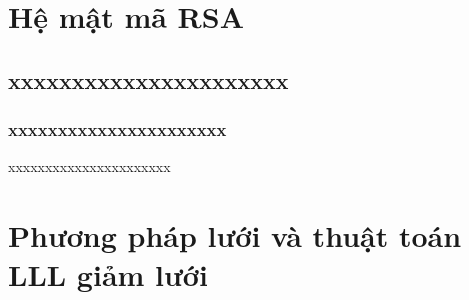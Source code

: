 \documentclass{beamer}
\begin{document}












 








\section{Hệ mật mã RSA}
\subsection{xxxxxxxxxxxxxxxxxxxxxx}
\subsubsection{xxxxxxxxxxxxxxxxxxxxxx}
\begin{frame}{xxxxxxxxxxxxxxxxxxxxxx}

\end{frame}





\section{Phương pháp lưới và thuật toán LLL giảm lưới}
\end{document}
